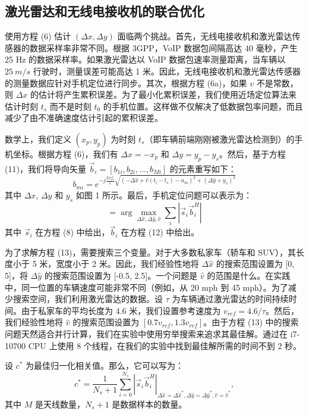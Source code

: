 \documentclass[journal, onecolumn]{IEEEtran}
\begin{document}
\subsection{激光雷达和无线电接收机的联合优化}
使用方程 (6) 估计 $(\Delta x,\Delta y)$ 面临两个挑战。首先，无线电接收机和激光雷达传感器的数据采样率非常不同。根据 3GPP，VoIP 数据包间隔高达 40 毫秒，产生 25 Hz 的数据采样率。如果激光雷达以 VoIP 数据包速率测量距离，当车辆以 $25~m/s$ 行驶时，测量误差可能高达 1 米。因此，无线电接收机和激光雷达传感器的测量数据应针对手机定位进行同步。其次，根据方程 (6a)，如果 $v$ 不是常数，则 $\Delta x$ 的估计将产生累积误差。为了最小化累积误差，我们使用近场定位算法来估计时刻 $t_{s}$ 而不是时刻 $t_{0}$ 的手机位置。这样做不仅解决了低数据包率问题，而且减少了由不准确速度估计引起的累积误差。

数学上，我们定义 $(x_{p},y_{p})$ 为时刻 $t_{s}$（即车辆前端刚刚被激光雷达检测到）的手机坐标。根据方程 (6)，我们有 $\Delta x=-x_{p}$ 和 $\Delta y=y_{p}-y_{s}$。然后，基于方程 (11)，我们将导向矢量 $\vec{b}_{i}=[b_{1i},b_{2i},\dots,b_{Mi}]$ 的元素重写如下：
\begin{equation}
b_{mi}=e^{-j\frac{2\pi f_{i}}{c}\sqrt{(-\Delta\hat{x}+\hat{v}(t_{i}-t_{s})-a_{m})^{2}+(\Delta\hat{y}+y_{s})^{2}}}
\end{equation}
其中 $\Delta x$, $\Delta y$ 和 $y_{s}$ 如图 1 所示。最后，手机定位问题可以表示为：
\begin{equation}
[\Delta\hat{x}^{*},\Delta\hat{y}^{*},\hat{v}^{*}]= \arg \max_{\Delta\hat{x},\Delta\hat{y},\hat{v}}\sum_{i}|\vec{s}_{i}\vec{b}_{i}^{H}|
\end{equation}
其中 $\vec{s}_{i}$ 在方程 (8) 中给出，$\vec{b}_{i}$ 在方程 (12) 中给出。

为了求解方程 (13)，需要搜索三个变量。对于大多数私家车（轿车和 SUV），其长度小于 5 米，宽度小于 2 米。因此，我们经验性地将 $\Delta\hat{x}$ 的搜索范围设置为 [0, 5]，将 $\Delta\hat{y}$ 的搜索范围设置为 [-0.5, 2.5]。一个问题是 $\hat{v}$ 的范围是什么。在实践中，同一位置的车辆速度可能非常不同（例如，从 20 mph 到 45 mph）。为了减少搜索空间，我们利用激光雷达的数据。设 $\tau$ 为车辆通过激光雷达的时间持续时间。由于私家车的平均长度为 4.6 米，我们设置参考速度为 $v_{ref}=4.6/\tau$。然后，我们经验性地将 $\hat{v}$ 的搜索范围设置为 $[0.7v_{ref}, 1.3v_{ref}]$。由于方程 (13) 中的搜索问题天然适合并行计算，我们在实验中使用穷举搜索来追求其最佳解。通过在 i7-10700 CPU 上使用 8 个线程，在我们的实验中找到最佳解所需的时间不到 2 秒。

设 $c^{*}$ 为最佳归一化相关值。那么，它可以写为：
\begin{equation}
c^{*} = \frac{1}{N_{s}+1} \sum_{i=0}^{N_{s}} |\vec{s}_{i}\vec{b}_{i}^{H}|_{\Delta\hat{x}=\Delta\hat{x}^{*},\Delta\hat{y}=\Delta\hat{y}^{*},\hat{v}=\hat{v}^{*}},
\end{equation}
其中 $M$ 是天线数量，$N_{s}+1$ 是数据样本的数量。
\end{document}
